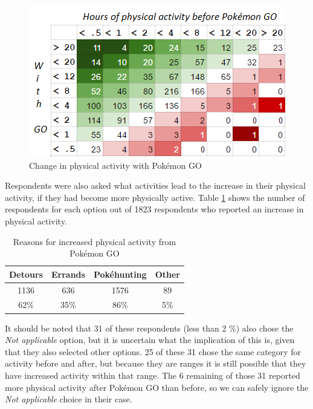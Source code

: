 \begin{figure}[h]
	\centering
	\includegraphics{Figures/change-in-physical-activity-table-colors}
	\caption{Change in physical activity with Pokémon GO}
	\label{fig:change-in-physical-activity}
\end{figure}

Respondents were also asked what activities lead to the increase in their physical activity, if they had become more physically active. Table \ref{tbl:physical-activity-sources} shows the number of respondents for each option out of 1823 respondents who reported an increase in physical activity.

\begin{table}[h]
	\centering
	\caption{Reasons for increased physical activity from Pokémon GO}
	\label{tbl:physical-activity-sources}
	\begin{tabular}{|c|c|c|c|}
		\hline
		\textbf{Detours} & \textbf{Errands} & \textbf{Pokéhunting} & \textbf{Other}\\\hline\hline
		1136 & 636 & 1576 & 89\\
		62\% & 35\% & 86\% & 5\%\\\hline
	\end{tabular}
\end{table}

It should be noted that 31 of these respondents (less than 2 \%) also chose the \emph{Not applicable} option, but it is uncertain what the implication of this is, given that they also selected other options. 25 of these 31 chose the same category for activity before and after, but because they are ranges it is still possible that they have increased activity within that range. The 6 remaining of those 31 reported more physical activity after Pokémon GO than before, so we can safely ignore the \emph{Not applicable} choice in their case. 

